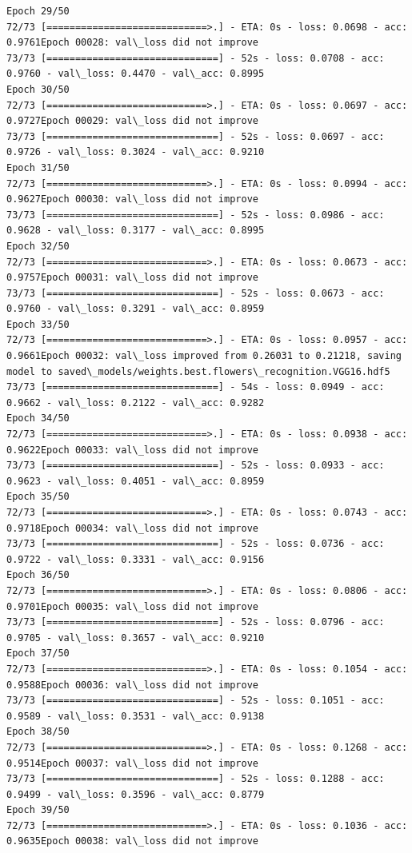 \documentclass[11pt]{article}
\begin{document}
\begin{Verbatim}[commandchars=\\\{\}]
Epoch 29/50
72/73 [============================>.] - ETA: 0s - loss: 0.0698 - acc: 0.9761Epoch 00028: val\_loss did not improve
73/73 [==============================] - 52s - loss: 0.0708 - acc: 0.9760 - val\_loss: 0.4470 - val\_acc: 0.8995
Epoch 30/50
72/73 [============================>.] - ETA: 0s - loss: 0.0697 - acc: 0.9727Epoch 00029: val\_loss did not improve
73/73 [==============================] - 52s - loss: 0.0697 - acc: 0.9726 - val\_loss: 0.3024 - val\_acc: 0.9210
Epoch 31/50
72/73 [============================>.] - ETA: 0s - loss: 0.0994 - acc: 0.9627Epoch 00030: val\_loss did not improve
73/73 [==============================] - 52s - loss: 0.0986 - acc: 0.9628 - val\_loss: 0.3177 - val\_acc: 0.8995
Epoch 32/50
72/73 [============================>.] - ETA: 0s - loss: 0.0673 - acc: 0.9757Epoch 00031: val\_loss did not improve
73/73 [==============================] - 52s - loss: 0.0673 - acc: 0.9760 - val\_loss: 0.3291 - val\_acc: 0.8959
Epoch 33/50
72/73 [============================>.] - ETA: 0s - loss: 0.0957 - acc: 0.9661Epoch 00032: val\_loss improved from 0.26031 to 0.21218, saving model to saved\_models/weights.best.flowers\_recognition.VGG16.hdf5
73/73 [==============================] - 54s - loss: 0.0949 - acc: 0.9662 - val\_loss: 0.2122 - val\_acc: 0.9282
Epoch 34/50
72/73 [============================>.] - ETA: 0s - loss: 0.0938 - acc: 0.9622Epoch 00033: val\_loss did not improve
73/73 [==============================] - 52s - loss: 0.0933 - acc: 0.9623 - val\_loss: 0.4051 - val\_acc: 0.8959
Epoch 35/50
72/73 [============================>.] - ETA: 0s - loss: 0.0743 - acc: 0.9718Epoch 00034: val\_loss did not improve
73/73 [==============================] - 52s - loss: 0.0736 - acc: 0.9722 - val\_loss: 0.3331 - val\_acc: 0.9156
Epoch 36/50
72/73 [============================>.] - ETA: 0s - loss: 0.0806 - acc: 0.9701Epoch 00035: val\_loss did not improve
73/73 [==============================] - 52s - loss: 0.0796 - acc: 0.9705 - val\_loss: 0.3657 - val\_acc: 0.9210
Epoch 37/50
72/73 [============================>.] - ETA: 0s - loss: 0.1054 - acc: 0.9588Epoch 00036: val\_loss did not improve
73/73 [==============================] - 52s - loss: 0.1051 - acc: 0.9589 - val\_loss: 0.3531 - val\_acc: 0.9138
Epoch 38/50
72/73 [============================>.] - ETA: 0s - loss: 0.1268 - acc: 0.9514Epoch 00037: val\_loss did not improve
73/73 [==============================] - 52s - loss: 0.1288 - acc: 0.9499 - val\_loss: 0.3596 - val\_acc: 0.8779
Epoch 39/50
72/73 [============================>.] - ETA: 0s - loss: 0.1036 - acc: 0.9635Epoch 00038: val\_loss did not improve

\end{Verbatim}
\end{document}
